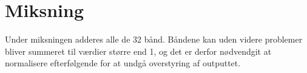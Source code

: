 \section{Miksning}
Under miksningen adderes alle de 32 bånd. Båndene kan uden videre
problemer bliver summeret til værdier større end 1, og det er derfor
nødvendgit at normalisere efterfølgende for at undgå overstyring af
outputtet.\\

